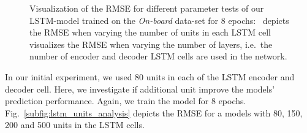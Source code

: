\begin{figure}[t!]
	\centering
    \vspace{-0.3cm}
    \caption{Visualization of the \ac{RMSE} for different parameter tests of our \ac{LSTM}-model trained on the \emph{On-board} data-set for \num{8} epochs:~\protect{} depicts the \ac{RMSE} when varying the number of units in each \ac{LSTM} cell~\protect{} visualizes the \ac{RMSE} when varying the number of layers, i.e.\ the number of encoder and decoder \ac{LSTM} cells are used in the network.}
    \label{fig:ngsim_dataset}
\end{figure}
In our initial experiment, we used \num{80} units in each of the \ac{LSTM} encoder and decoder cell.
Here, we investigate if additional unit improve the models' prediction performance.
Again, we train the model for \num{8} epochs.
Fig.~\ref{subfig:lstm_units_analysis} depicts the \ac{RMSE} for a models with \num{80}, \num{150}, \num{200} and \num{500} units in the \ac{LSTM} cells.
